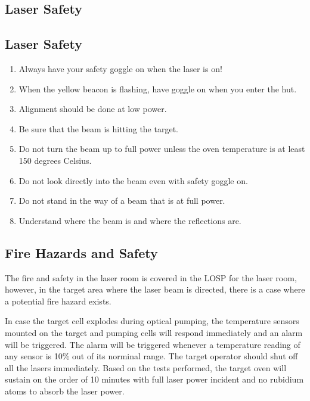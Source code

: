 \begin{safetyen}{10}{5}
\section{Laser Safety}
\label{sec:lsafe}

\subsection{Laser Safety}
\label{sec:lassaf}

\begin{enumerate}
\item Always have your safety goggle on when the laser is on!
\item When the yellow beacon is flashing, have goggle on when you enter
the hut.
\item Alignment should be done at low power.
\item Be sure that the beam is hitting the target.
\item Do not turn the beam up to full power unless the oven temperature
is at least 150 degrees Celsius.
\item Do not look directly into the beam even with safety goggle on.
\item Do not stand in the way of a beam that is at full power.
\item Understand where the beam is and where the reflections are.
\end{enumerate}

\subsection{Fire Hazards and Safety}
\label{sec:targ-polhelfire}

The fire and safety in the laser room is covered in the LOSP
for the laser room,
however, in the target area where the laser beam is directed, there is a
case where a potential 
fire hazard exists. 

In case the target cell explodes during optical pumping, the temperature 
sensors mounted on the target and pumping cells will respond immediately and 
an alarm will be triggered. The alarm will be triggered whenever 
a temperature reading of any sensor is 10$\%$ out of its norminal range.
The target operator should shut off all the lasers immediately.
Based on the tests performed, the target oven will sustain on the order of 10 
minutes with full laser power incident and no rubidium atoms 
to absorb the laser power.



\end{safetyen}
